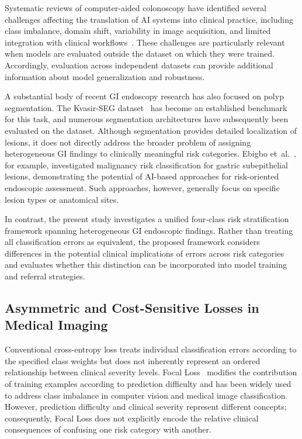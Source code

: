 \documentclass[11pt,a4paper]{article}
\begin{document}
Systematic reviews of computer-aided colonoscopy have identified several
challenges affecting the translation of AI systems into clinical practice,
including class imbalance, domain shift, variability in image acquisition,
and limited integration with clinical workflows~\citep{Ahmad2021}. These
challenges are particularly relevant when models are evaluated outside the
dataset on which they were trained. Accordingly, evaluation across independent
datasets can provide additional information about model generalization and
robustness.

A substantial body of recent GI endoscopy research has also focused on polyp
segmentation. The Kvasir-SEG dataset~\citep{Jha2020} has become an established
benchmark for this task, and numerous segmentation architectures have
subsequently been evaluated on the dataset. Although segmentation provides
detailed localization of lesions, it does not directly address the broader
problem of assigning heterogeneous GI findings to clinically meaningful risk
categories. Ebigbo et~al.~\citep{Ebigbo2019}, for example, investigated
malignancy risk classification for gastric subepithelial lesions,
demonstrating the potential of AI-based approaches for risk-oriented
endoscopic assessment. Such approaches, however, generally focus on specific
lesion types or anatomical sites.

In contrast, the present study investigates a unified four-class risk
stratification framework spanning heterogeneous GI endoscopic findings.
Rather than treating all classification errors as equivalent, the proposed
framework considers differences in the potential clinical implications of
errors across risk categories and evaluates whether this distinction can be
incorporated into model training and referral strategies.

\subsection{Asymmetric and Cost-Sensitive Losses in Medical Imaging}
Conventional cross-entropy loss treats individual classification errors
according to the specified class weights but does not inherently represent an
ordered relationship between clinical severity levels. Focal Loss~\citep{Lin2017}
modifies the contribution of training examples according to prediction
difficulty and has been widely used to address class imbalance in computer
vision and medical image classification. However, prediction difficulty and
clinical severity represent different concepts; consequently, Focal Loss does
not explicitly encode the relative clinical consequences of confusing one risk
category with another.
\end{document}
